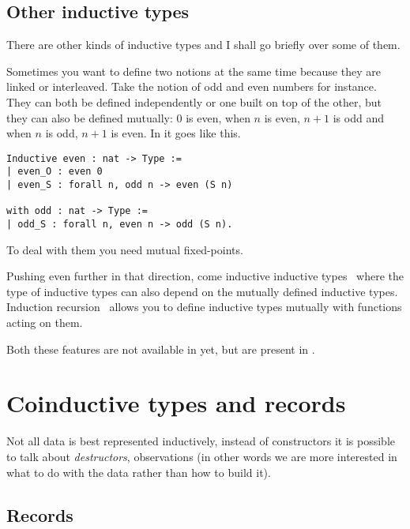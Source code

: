 \subsection{Other inductive types}

There are other kinds of inductive types and I shall go briefly over some of
them.


Sometimes you want to define two notions at the same time because they are
linked or interleaved.
Take the notion of odd and even numbers for instance. They can both be defined
independently or one built on top of the other, but they can also be defined
mutually: \(0\) is even, when \(n\) is even, \(n+1\) is odd and when \(n\)
is odd, \(n+1\) is even.
In \Coq it goes like this.
\begin{verbatim}
Inductive even : nat -> Type :=
| even_O : even 0
| even_S : forall n, odd n -> even (S n)

with odd : nat -> Type :=
| odd_S : forall n, even n -> odd (S n).
\end{verbatim}

To deal with them you need mutual fixed-points.


Pushing even further in that direction, come inductive inductive
types~ where the type of inductive types
can also depend on the mutually defined inductive types.
Induction recursion~ allows you to define
inductive types mutually with functions acting on them.

Both these features are not available in \Coq yet, but are present in \Agda.

\section{Coinductive types and records}

Not all data is best represented inductively, instead of constructors it is
possible to talk about \emph{destructors}, \ie observations (in other words we
are more interested in what to do with the data rather than how to build it).

\subsection{Records}

